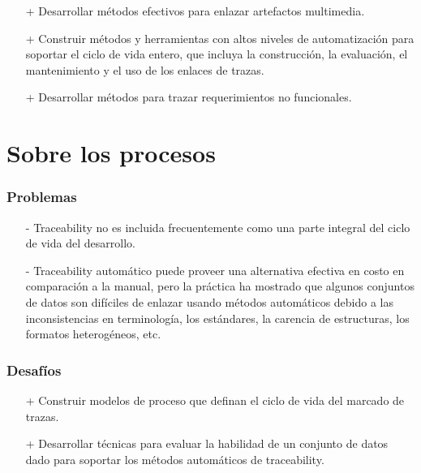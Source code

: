\documentclass[a4paper,12pt,oneside]{book}
\begin{document}
\begin{itemize}

\item[+]     Desarrollar métodos efectivos para enlazar artefactos multimedia.

\item[+]    Construir métodos y herramientas con altos niveles de automatización para soportar el ciclo de vida entero, que incluya la construcción, la evaluación, el mantenimiento y el uso de los enlaces de trazas.

\item[+]    Desarrollar métodos para trazar requerimientos no funcionales.

\end{itemize}

\section{Sobre los procesos}

\subsubsection{Problemas}

\begin{itemize}

\item[-]     Traceability no es incluida frecuentemente como una parte integral del ciclo de vida del desarrollo.

\item[-]    Traceability automático puede proveer una alternativa efectiva en costo en comparación a la manual, pero la práctica ha mostrado que algunos conjuntos de datos son difíciles de enlazar usando métodos automáticos debido a las inconsistencias en terminología, los estándares, la carencia de estructuras, los formatos heterogéneos, etc.

\end{itemize}

\subsubsection{Desafíos}

\begin{itemize}

\item[+]     Construir modelos de proceso que definan el ciclo de vida del marcado de trazas.

\item[+]   Desarrollar técnicas para evaluar la habilidad de un conjunto de datos dado para soportar los métodos automáticos de traceability.
 
\end{itemize}
\end{document}
